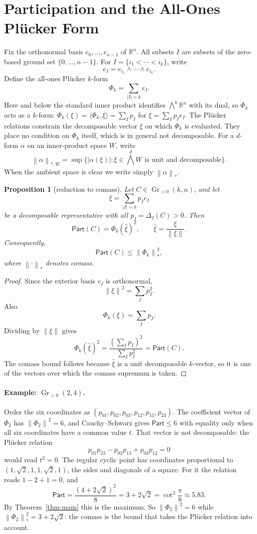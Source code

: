 \documentclass[11pt]{article}
\newtheorem{proposition}[theorem]{Proposition}
\newcommand{\Gr}{\operatorname{Gr}}
\newcommand{\Part}{\mathsf{Part}}
\newcommand{\R}{\mathbb{R}}
\newcommand{\abs}[1]{\left|#1\right|}
\newcommand{\norm}[1]{\left\|#1\right\|}
\begin{document}
\section{Participation and the All-Ones Plücker Form}

Fix the orthonormal basis \(e_0,\ldots,e_{n-1}\) of \(\R^n\).  All subsets
\(I\) are subsets of the zero-based ground set \(\{0,\ldots,n-1\}\).  For
\(I=\{i_1<\cdots<i_k\}\), write
\[
  e_I=e_{i_1}\wedge\cdots\wedge e_{i_k}.
\]
Define the all-ones Plücker \(k\)-form
\[
  \Phi_k=\sum_{|I|=k} e_I.
\]
Here and below the standard inner product identifies \(\bigwedge^k\R^n\) with its dual, so
\(\Phi_k\) acts as a \(k\)-form: \(\Phi_k(\xi)=\langle\Phi_k,\xi\rangle=\sum_I p_I\) for
\(\xi=\sum_I p_Ie_I\).  The Plücker relations constrain the decomposable vector \(\xi\) on which
\(\Phi_k\) is evaluated.  They place no condition on \(\Phi_k\) itself, which is in general not
decomposable.
For a \(d\)-form \(\alpha\) on an inner-product space \(W\), write
\[
  \norm{\alpha}_{*,W}
  =
  \sup\{\abs{\alpha(\xi)}:\xi\in\bigwedge^d W
  \text{ is unit and decomposable}\}.
\]
When the ambient space is clear we write simply \(\norm{\alpha}_*\).

\begin{proposition}[reduction to comass]
\label{prop:comass-reduction}
Let \(C\in\Gr_{>0}(k,n)\), and let
\[
  \xi=\sum_{|I|=k}p_I e_I
\]
be a decomposable representative with all \(p_I=\Delta_I(C)>0\).  Then
\[
  \Part(C)=\Phi_k(\widehat{\xi})^2,
  \qquad
  \widehat{\xi}=\frac{\xi}{\norm{\xi}}.
\]
Consequently,
\[
  \Part(C)\leq \norm{\Phi_k}_*^2,
\]
where \(\norm{\cdot}_*\) denotes comass.
\end{proposition}

\begin{proof}
Since the exterior basis \(e_I\) is orthonormal,
\[
  \norm{\xi}^2=\sum_I p_I^2.
\]
Also
\[
  \Phi_k(\xi)=\sum_I p_I.
\]
Dividing by \(\norm{\xi}\) gives
\[
  \Phi_k(\widehat{\xi})^2
  =
  \frac{\left(\sum_I p_I\right)^2}{\sum_I p_I^2}
  =
  \Part(C).
\]
The comass bound follows because \(\widehat{\xi}\) is a unit decomposable
\(k\)-vector, so it is one of the vectors over which the comass supremum is
taken.
\end{proof}

\paragraph{Example: \(\Gr_{>0}(2,4)\).}
Order the six coordinates as \((p_{01},p_{02},p_{03},p_{12},p_{13},p_{23})\).  The coefficient
vector of \(\Phi_2\) has \(\norm{\Phi_2}^2=6\), and Cauchy--Schwarz gives \(\Part\le6\) with
equality only when all six coordinates have a common value \(t\).  That vector is not
decomposable: the Plücker relation
\[
  p_{01}p_{23}-p_{02}p_{13}+p_{03}p_{12}=0
\]
would read \(t^2=0\).  The regular cyclic point has coordinates proportional to
\((1,\sqrt2,1,1,\sqrt2,1)\), the sides and diagonals of a square.  For it the relation reads
\(1-2+1=0\), and
\[
  \Part=\frac{(4+2\sqrt2)^2}{8}=3+2\sqrt2=\cot^2\frac{\pi}{8}\approx5.83 .
\]
By Theorem~\ref{thm:main} this is the maximum.  So \(\norm{\Phi_2}^2=6\) while
\(\norm{\Phi_2}_*^2=3+2\sqrt2\): the comass is the bound that takes the Plücker relation into
account.
\end{document}
